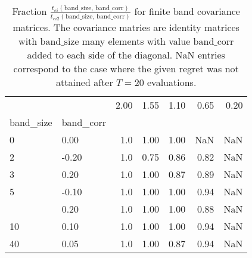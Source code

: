 \begin{table}
\centering
\caption{Fraction $\frac{t_{ei}(\text{band\_size, 
    band\_corr})}{t_{ei2}(\text{band\_size, band\_corr})}$ 
    for finite band covariance matrices. The covariance matries are identity 
    matrices with $\text{band\_size}$ many elements with value $\text{band\_corr}$ 
    added to each side of the diagonal. NaN entries correspond to the 
    case where the given regret was not attained after $T=20$ evaluations.}
\label{fig:band_ei_vs_ei2}
\begin{tabular}{llrrrrr}
\toprule
   &       &  2.00 &  1.55 &  1.10 &  0.65 &  0.20 \\
band\_size & band\_corr &       &       &       &       &       \\
\midrule
0  &  0.00 &   1.0 &  1.00 &  1.00 &   NaN &   NaN \\
2  & -0.20 &   1.0 &  0.75 &  0.86 &  0.82 &   NaN \\
3  &  0.20 &   1.0 &  1.00 &  0.87 &  0.89 &   NaN \\
5  & -0.10 &   1.0 &  1.00 &  1.00 &  0.94 &   NaN \\
   &  0.20 &   1.0 &  1.00 &  1.00 &  0.88 &   NaN \\
10 &  0.10 &   1.0 &  1.00 &  1.00 &  0.94 &   NaN \\
40 &  0.05 &   1.0 &  1.00 &  0.87 &  0.94 &   NaN \\
\bottomrule
\end{tabular}
\end{table}
